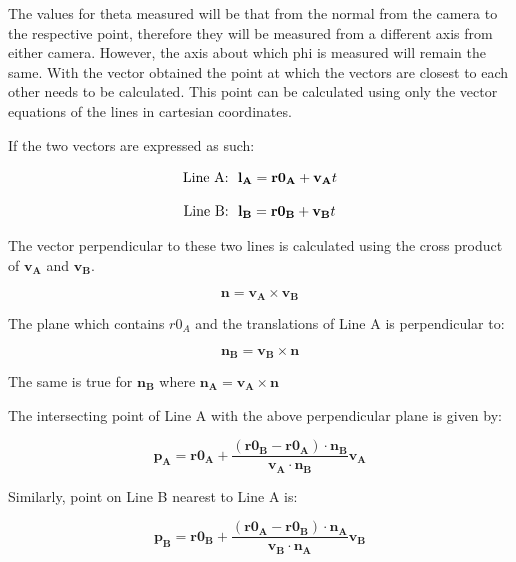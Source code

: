 \documentclass{article}
\begin{document}
The values for theta measured will be that from the normal from the camera to the respective point, therefore they will be measured from a different axis from either camera. However, the axis about which phi is measured will remain the same. With the vector obtained the point at which the vectors are closest to each other needs to be calculated. This point can be calculated using only the vector equations of the lines in cartesian coordinates.

If the two vectors are expressed as such:

\begin{equation}
	\textnormal{Line A: } \ \mathbf{l_A}=\mathbf{r0_A}+\mathbf{v_A} t 
\end{equation}

\begin{equation}
	\textnormal{Line B: } \ \mathbf{l_B}=\mathbf{r0_B}+\mathbf{v_B} t
\end{equation}

The vector perpendicular to these two lines is calculated using the cross product of $\mathbf{v_A}$ and $\mathbf{v_B}$.

\begin{equation}
	\mathbf{n}= \mathbf{v_A} \times \mathbf{v_B}
\end{equation}


The plane which contains $r0_A$ and the translations of Line A is perpendicular to: 

\begin{equation}
	\mathbf{n_B}= \mathbf{v_B} \times \mathbf{n}
\end{equation}

The same is true for $\mathbf{n_B} $ where $\mathbf{n_A}= \mathbf{v_A} \times \mathbf{n}$

The intersecting point of Line A with the above perpendicular plane is given by: 

\begin{equation}
	\mathbf{p_A}=\mathbf{r0_A}+ \frac{(\mathbf{r0_B}-\mathbf{r0_A})\cdot\mathbf{n_B}}{\mathbf{v_A}\cdot\mathbf{n_B}} \mathbf{v_A}
\end{equation}

Similarly, point on Line B nearest to Line A is:

\begin{equation}
	\mathbf{p_B}=\mathbf{r0_B}+ \frac{(\mathbf{r0_A}-\mathbf{r0_B})\cdot\mathbf{n_A}}{\mathbf{v_B}\cdot\mathbf{n_A}} \mathbf{v_B}
\end{equation}
\end{document}
